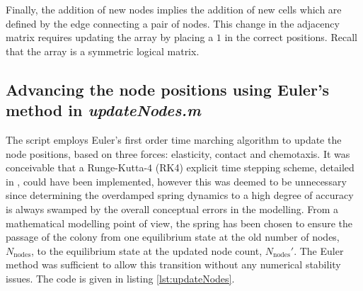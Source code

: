 Finally, the addition of new nodes implies the addition of new cells which 
are defined by the edge connecting a pair of nodes. This 
change in the adjacency matrix requires updating the 
array by placing a $1$ in the correct positions. Recall that 
the  array is a symmetric logical matrix.

\subsection{Advancing the node positions using Euler's method in \textit{updateNodes.m}} \label{ssec:updatenodes}
The  script employs Euler's first order
time marching algorithm to update the node positions, 
based on three forces: elasticity, contact and chemotaxis. 
It was conceivable that a Runge-Kutta-$4$ (RK4) explicit time stepping scheme,
 detailed in \cite{zingg1999runge},
could have been implemented, however this was deemed to be unnecessary since
determining the overdamped spring dynamics to a high degree of accuracy 
is always swamped by the overall conceptual errors in the modelling. 
From a mathematical modelling point of view, the spring has been 
chosen to ensure the passage of the colony from one equilibrium state 
at the old number of nodes, $N_{\textrm{nodes}}$, to the equilibrium state 
at the updated node count, $N_{\textrm{nodes}}'$. The Euler method 
was sufficient to allow this transition without 
any numerical stability issues. The code is given  in listing \ref{lst:updateNodes}.

